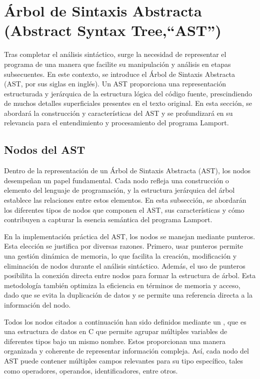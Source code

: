 \newpage

\section{Árbol de Sintaxis Abstracta (Abstract Syntax Tree,``AST'')}\label{sec:implementacionAST}
Tras completar el análisis sintáctico, surge la necesidad de representar el programa de una manera que facilite su manipulación y análisis en etapas subsecuentes. En este contexto, se introduce el Árbol de Sintaxis Abstracta (AST, por sus siglas en inglés). Un AST proporciona una representación estructurada y jerárquica de la estructura lógica del código fuente, prescindiendo de muchos detalles superficiales presentes en el texto original. En esta sección, se abordará la construcción y características del AST y se profundizará en su relevancia para el entendimiento y procesamiento del programa Lamport.

\subsection{Nodos del AST}
Dentro de la representación de un Árbol de Sintaxis Abstracta (AST), los nodos desempeñan un papel fundamental. Cada nodo refleja una construcción o elemento del lenguaje de programación, y la estructura jerárquica del árbol establece las relaciones entre estos elementos. En esta subsección, se abordarán los diferentes tipos de nodos que componen el AST, sus características y cómo contribuyen a capturar la esencia semántica del programa Lamport.



En la implementación práctica del AST, los nodos se manejan mediante punteros. Esta elección se justifica por diversas razones. Primero, usar punteros permite una gestión dinámica de memoria, lo que facilita la creación, modificación y eliminación de nodos durante el análisis sintáctico. Además, el uso de punteros posibilita la conexión directa entre nodos para formar la estructura de árbol. Esta metodología también optimiza la eficiencia en términos de memoria y acceso, dado que se evita la duplicación de datos y se permite una referencia directa a la información del nodo.


Todos los nodos citados a continuación han sido definidos mediante un , que es una estructura de datos en C que permite agrupar múltiples variables de diferentes tipos bajo un mismo nombre. Estos  proporcionan una manera organizada y coherente de representar información compleja. Así, cada nodo del AST puede contener múltiples campos relevantes para su tipo específico, tales como operadores, operandos, identificadores, entre otros. 


